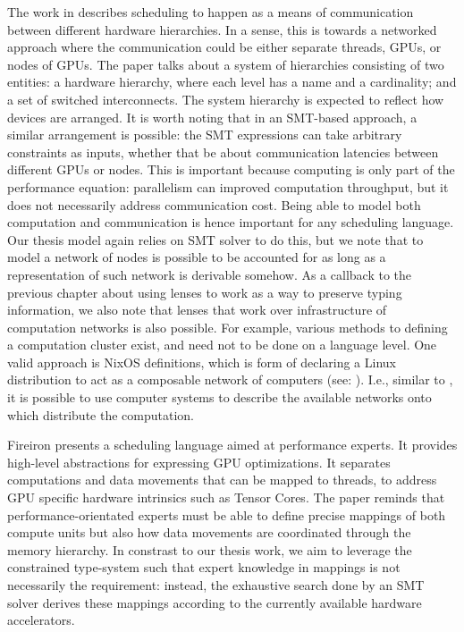 \documentclass[10pt,a4paper]{article}
\begin{document}
The work in \cite{SynthesizingOpXieN2022} describes scheduling to happen as a means of communication between different hardware hierarchies.
In a sense, this is towards a networked approach where the communication could be either separate threads, GPUs, or nodes of GPUs.
The paper talks about a system of hierarchies consisting of two entities: a hardware hierarchy, where each level has a name and a cardinality; and a set of switched interconnects.
The system hierarchy is expected to reflect how devices are arranged.
It is worth noting that in an SMT-based approach, a similar arrangement is possible: the SMT expressions can take arbitrary constraints as inputs, whether that be about communication latencies between different GPUs or nodes.
This is important because computing is only part of the performance equation: parallelism can improved computation throughput, but it does not necessarily address communication cost.
Being able to model both computation and communication is hence important for any scheduling language.
Our thesis model again relies on SMT solver to do this, but we note that to model a network of nodes is possible to be accounted for as long as a representation of such network is derivable somehow.
As a callback to the previous chapter about using lenses to work as a way to preserve typing information, we also note that lenses that work over infrastructure of computation networks is also possible.
For example, various methods to defining a computation cluster exist, and need not to be done on a language level.
One valid approach is NixOS definitions, which is form of declaring a Linux distribution to act as a composable network of computers (see: \cite{augeas}).
I.e., similar to \cite{augeas}, it is possible to use computer systems to describe the available networks onto which distribute the computation.

Fireiron \cite{FireironHagedo2020} presents a scheduling language aimed at performance experts.
It provides high-level abstractions for expressing GPU optimizations.
It separates computations and data movements that can be mapped to threads, to address GPU specific hardware intrinsics such as Tensor Cores.
The paper reminds that performance-orientated experts must be able to define precise mappings of both compute units but also how data movements are coordinated through the memory hierarchy.
In constrast to our thesis work, we aim to leverage the constrained type-system such that expert knowledge in mappings is not necessarily the requirement: instead, the exhaustive search done by an SMT solver derives these mappings according to the currently available hardware accelerators.
\end{document}
